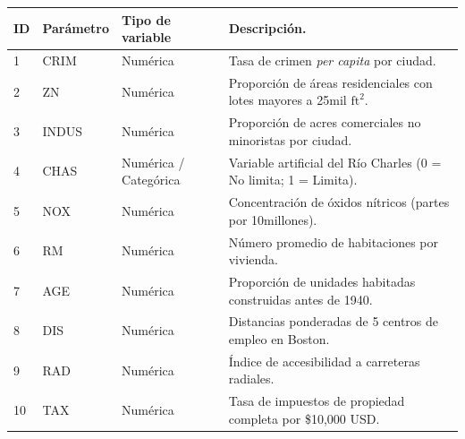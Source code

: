\documentclass[11pt, letterpaper]{article}
\begin{document}
\begin{table}[h!]
\centering
\begin{adjustbox}{width=\textwidth}
\begin{tabular}{llll}
\hline
\textbf{ID} & \textbf{Parámetro} & {\color[HTML]{000000} \textbf{Tipo de variable}} & \textbf{Descripción.}                                                                 \\ \hline
1           & CRIM               & {\color[HTML]{FE0000} Numérica}                  & Tasa de crimen \textit{per capita} por ciudad.                                                 \\
2           & ZN                 & {\color[HTML]{FE0000} Numérica}                  & Proporción de áreas residenciales con lotes mayores a 25mil $\mathrm{ft}^2$.          \\
3           & INDUS              & {\color[HTML]{FE0000} Numérica}                  & Proporción de acres comerciales no minoristas por ciudad.                             \\
4           & CHAS               & {\color[HTML]{FE0000} Numérica} / {\color[HTML]{32CB00} Categórica}     & Variable artificial del Río Charles (0 = No limita; 1 = Limita).                      \\
5           & NOX                & {\color[HTML]{FE0000} Numérica}                  & Concentración de óxidos nítricos (partes por 10millones).                             \\
6           & RM                 & {\color[HTML]{FE0000} Numérica}                  & Número promedio de habitaciones por vivienda.                                         \\
7           & AGE                & {\color[HTML]{FE0000} Numérica}                  & Proporción de unidades habitadas construidas antes de 1940.                           \\
8           & DIS                & {\color[HTML]{FE0000} Numérica}                  & Distancias ponderadas de 5 centros de empleo en Boston.                               \\
9           & RAD                & {\color[HTML]{FE0000} Numérica}                  & Índice de accesibilidad a carreteras radiales.                                        \\
10          & TAX                & {\color[HTML]{FE0000} Numérica}                  & Tasa de impuestos de propiedad completa por \$10,000 USD.                             \\

\end{tabular}
\end{adjustbox}
\end{table}
\end{document}
